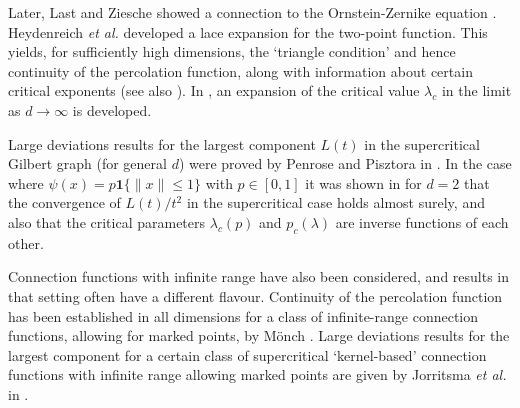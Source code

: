 \documentclass[a4paper,12pt]{scrartcl}
\newcommand{\conn}{\psi}
\theoremstyle{definition}
\theoremstyle{remark}
\begin{document}
Later,
Last and Ziesche showed a connection to the Ornstein-Zernike equation \cite{LastZiescheStationary}.  Heydenreich {\em et al.}
\cite{lace_exp_mean}
developed a lace expansion for the two-point function.
This yields, for
sufficiently high dimensions, the `triangle condition'
and hence continuity of the percolation function, along with information
about
certain critical exponents (see also
\cite{caicedo2023critical}).
In \cite{dickson2023expansion},
an expansion of the critical value $\lambda_c$ in the limit as $d\to\infty$
is developed.

Large deviations results for the largest component $L(t)$
in the supercritical Gilbert graph (for general $d$) were proved
by Penrose and Pisztora in \cite{penrose1996large}.
In the case where $\conn(x) = p\mathbf{1}\{\|x\|\leq 1\}$
with $p \in [0,1]$ it was shown in \cite{mit_giant_comp_srgg} for $d=2$ that the convergence of $L(t)/t^2$ in
the supercritical case holds almost surely,
and also that the critical parameters $\lambda_c(p)$ and $p_c(\lambda)$ are inverse functions  of each other.

Connection functions with infinite range have also been considered,
and results in that setting often have a different flavour.
Continuity of the percolation function has been established
in all dimensions for a class of infinite-range  connection functions,
allowing for marked points,
by M\"{o}nch \cite{monch}.
Large deviations results for the largest component
for a  certain class of supercritical
`kernel-based' connection functions with infinite range allowing marked points
are given by Jorritsma {\em et al.} in \cite{jorritsma2025large}.
\end{document}
